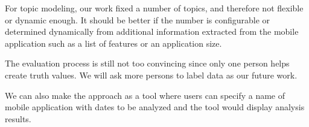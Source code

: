 For topic modeling, our work fixed a number of topics, and therefore not flexible or dynamic enough. It should be better if the number is configurable or determined dynamically from additional information extracted from the mobile application such as a list of features or an application size.

The evaluation process is still not too convincing since only one person helps create truth values. We will ask more persons to label data as our future work.

We can also make the approach as a tool where users can specify a name of mobile application with dates to be analyzed and the tool would display analysis results.



%
%


